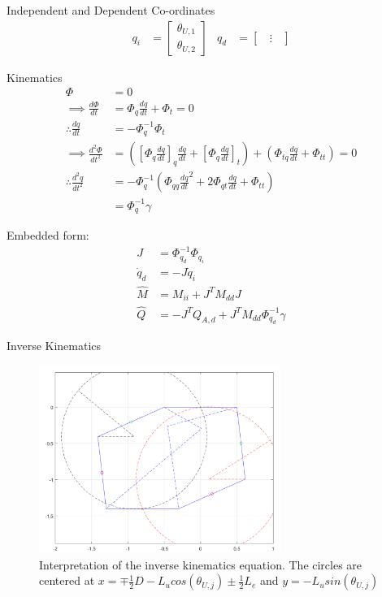 Independent and Dependent Co-ordinates
\begin{align}
    q_i&=
    \begin{bmatrix}
    \theta_{U,1} \\
    \theta_{U,2}
    \end{bmatrix} &
    q_d&=
    \begin{bmatrix}
    \; \; \vdots \; \;
    \end{bmatrix}
\end{align}

Kinematics
\begin{align}
            \Phi &= 0  \nonumber \\
\implies \tfrac{d\Phi}{dt} &=\Phi_q \tfrac{dq}{dt}+ \Phi_t =0 \label{eq:PhiDot} \\
\therefore \tfrac{dq}{dt}&=-\Phi_q^{-1} \Phi_t \\
\implies \tfrac{d^2\Phi}{dt^2} &=([\Phi_{q}\tfrac{dq}{dt}]_q\tfrac{dq}{dt}+[\Phi_{q}\tfrac{dq}{dt}]_t)+(\Phi_{tq}\tfrac{dq}{dt}+\Phi_{tt})=0 \label{eq:PhiDDot} \\
\therefore  \tfrac{d^2q}{dt^2}&=-\Phi_q^{-1} (\Phi_{qq}\tfrac{dq}{dt}^2+2\Phi_{qt}\tfrac{dq}{dt}+\Phi_{tt}) \nonumber \\
                    &=\Phi_q^{-1} \gamma \label{eq:Gamma}
\end{align}

Embedded form:
\begin{align}
         J&=\Phi_{q_d}^{-1}\Phi_{q_i} \\
 \dot{q}_d&=-J\dot{q}_i\\
   \hat{M}&=M_{ii}+ J^T M_{dd}J\\
   \hat{Q}&=-J^T Q_{A,d}+J^T M_{dd}\Phi_{q_d}^{-1}\gamma
\end{align}

Inverse Kinematics

\begin{figure}[h!]
	\centering
	\includegraphics[width=0.7\textwidth]{figures/Inverse_2D.png}                                                              
	\caption[Interpretation of the inverse kinematics equation]{Interpretation of the inverse kinematics equation. The circles are centered at $x=\mp\tfrac{1}{2}D-L_u cos(\theta_{U,j})\pm\tfrac{1}{2}L_e$  and $y=-L_u sin(\theta_{U,j})$}
	\label{fig:inverse2D}
\end{figure}


